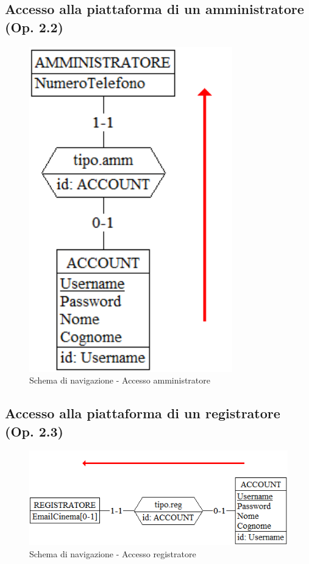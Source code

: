 \documentclass[a4paper,12pt]{report}
\begin{document}
	\subsection{Accesso alla piattaforma di un amministratore (Op. 2.2)}
	\begin{figure}[H]
		\centering
		\includegraphics[width=250pt]{ER/navigazione/accessoamm.png}
		\caption{Schema di navigazione - Accesso amministratore}
	\end{figure}
	
	\subsection{Accesso alla piattaforma di un registratore (Op. 2.3)}
	\begin{figure}[H]
		\centering
		\includegraphics{ER/navigazione/accessoreg.png}
		\caption{Schema di navigazione - Accesso registratore}
	\end{figure}
	
\end{document}
